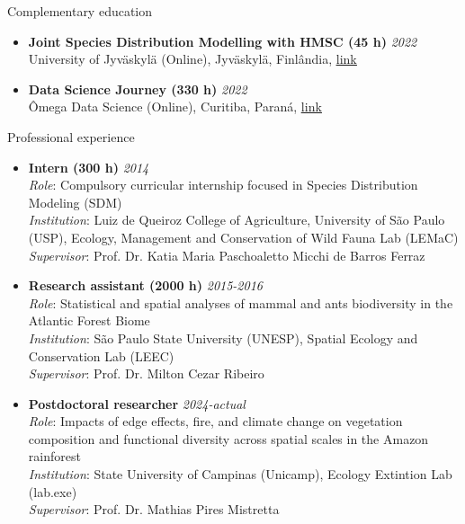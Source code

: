 \documentclass{resume}
\begin{document}
\begin{rSection}{Complementary education}
\begin{itemize}
\item {\bf Joint Species Distribution Modelling with HMSC (45 h)} \hfill {\em 2022}\\
University of Jyväskylä (Online), Jyväskylä, Finlândia, \href{https://www.helsinki.fi/en/researchgroups/statistical-ecology/software/hmsc}{\underline{link}}

\item {\bf Data Science Journey (330 h)} \hfill {\em 2022}\\
Ômega Data Science (Online), Curitiba, Paraná, \href{https://escola.omegadatascience.com.br}{\underline{link}}
\end{itemize} 

\end{rSection}


\begin{rSection}{Professional experience}
\begin{itemize}
\item {\bf Intern (300 h)} \hfill{\em 2014}\\
{\it Role}: Compulsory curricular internship focused in Species Distribution Modeling (SDM)\\
{\it Institution}: Luiz de Queiroz College of Agriculture, University of São Paulo (USP), Ecology, Management and Conservation of Wild Fauna Lab (LEMaC)\\
{\it Supervisor}: Prof. Dr. Katia Maria Paschoaletto Micchi de Barros Ferraz

\item {\bf Research assistant (2000 h)} \hfill{\em 2015-2016}\\
{\it Role}: Statistical and spatial analyses of mammal and ants biodiversity in the Atlantic Forest Biome\\
{\it Institution}: São Paulo State University (UNESP), Spatial Ecology and Conservation Lab (LEEC)\\
{\it Supervisor}: Prof. Dr. Milton Cezar Ribeiro

\item {\bf Postdoctoral researcher} \hfill{\em 2024-actual}\\
{\it Role}: Impacts of edge effects, fire, and climate change on vegetation composition and functional diversity across spatial scales in the Amazon rainforest\\
{\it Institution}: State University of Campinas (Unicamp), Ecology Extintion Lab (lab.exe)\\
{\it Supervisor}: Prof. Dr. Mathias Pires Mistretta
\end{itemize}
\end{rSection}
\end{document}
